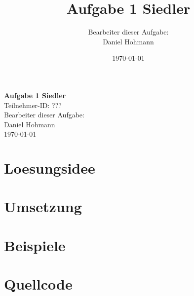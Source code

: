 \documentclass{article}
\title{\Huge{\textbf{Aufgabe 1 Siedler}} \\ \centering{\LARGE{Teilnahme-ID: ?????}}}
\author{Bearbeiter dieser Aufgabe: \\ Daniel Hohmann}
\date{\today}
\begin{document}
\thispagestyle{empty}
\begin{center}
\Huge{\textbf{Aufgabe 1 Siedler}}
\\
\LARGE{Teilnehmer-ID: ???}
\\
\LARGE{Bearbeiter dieser Aufgabe: \\ Daniel Hohmann}
\\
\LARGE{\today}
\end{center}
\newpage
\setcounter{page}{1}
\tableofcontents
\newpage
\section{Loesungsidee}
\section{Umsetzung}
\section{Beispiele}
\section{Quellcode}
\end{document}
